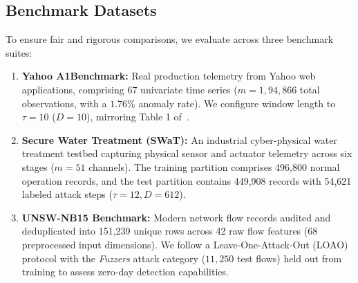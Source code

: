 \documentclass[conference]{IEEEtran}
\begin{document}
\subsection{Benchmark Datasets}
To ensure fair and rigorous comparisons, we evaluate across three benchmark suites:
\begin{enumerate}
    \item \textbf{Yahoo A1Benchmark:} Real production telemetry from Yahoo web applications, comprising 67 univariate time series ($m=1, 94,866$ total observations, with a $1.76\%$ anomaly rate). We configure window length to $\tau=10$ ($D=10$), mirroring Table 1 of~\cite{yang2023adt}.
    \item \textbf{Secure Water Treatment (SWaT):} An industrial cyber-physical water treatment testbed capturing physical sensor and actuator telemetry across six stages ($m=51$ channels). The training partition comprises 496,800 normal operation records, and the test partition contains 449,908 records with 54,621 labeled attack steps ($\tau=12, D=612$).
    \item \textbf{UNSW-NB15 Benchmark:} Modern network flow records audited and deduplicated into 151,239 unique rows across 42 raw flow features ($68$ preprocessed input dimensions). We follow a Leave-One-Attack-Out (LOAO) protocol with the \textit{Fuzzers} attack category ($11,250$ test flows) held out from training to assess zero-day detection capabilities.
\end{enumerate}

\begin{table}[t]
\centering
\caption{ADT and U-CADT Parameter Configurations}
\label{tab:parameters}
\end{table}
\end{document}
